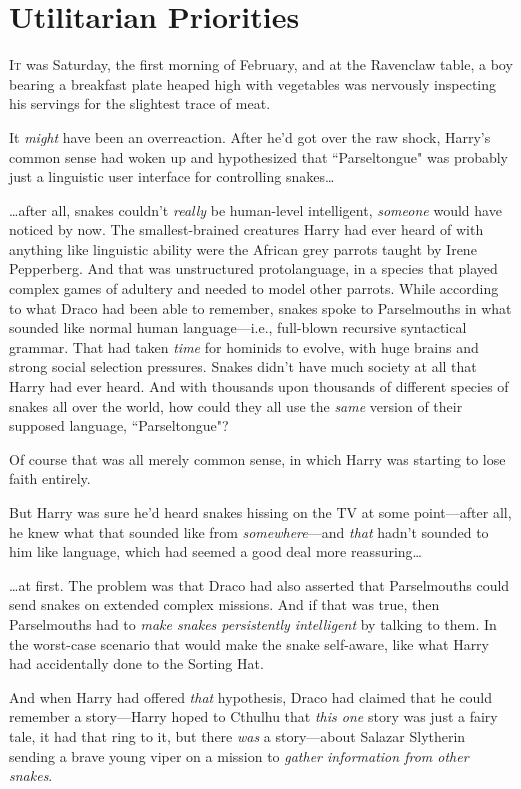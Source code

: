 \chapter{Utilitarian Priorities}

\lettrine{I}{t} was Saturday, the first morning of February, and at the Ravenclaw table, a boy bearing a breakfast plate heaped high with vegetables was nervously inspecting his servings for the slightest trace of meat.

It \emph{might} have been an overreaction. After he'd got over the raw shock, Harry's common sense had woken up and hypothesized that ``Parseltongue" was probably just a linguistic user interface for controlling snakes{\ldots}

{\ldots}after all, snakes couldn't \emph{really} be human-level intelligent, \emph{someone} would have noticed by now. The smallest-brained creatures Harry had ever heard of with anything like linguistic ability were the African grey parrots taught by Irene Pepperberg. And that was unstructured protolanguage, in a species that played complex games of adultery and needed to model other parrots. While according to what Draco had been able to remember, snakes spoke to Parselmouths in what sounded like normal human language—i.e., full-blown recursive syntactical grammar. That had taken \emph{time} for hominids to evolve, with huge brains and strong social selection pressures. Snakes didn't have much society at all that Harry had ever heard. And with thousands upon thousands of different species of snakes all over the world, how could they all use the \emph{same} version of their supposed language, ``Parseltongue"?

Of course that was all merely common sense, in which Harry was starting to lose faith entirely.

But Harry was sure he'd heard snakes hissing on the TV at some point—after all, he knew what that sounded like from \emph{somewhere}—and \emph{that} hadn't sounded to him like language, which had seemed a good deal more reassuring{\ldots}

{\ldots}at first. The problem was that Draco had also asserted that Parselmouths could send snakes on extended complex missions. And if that was true, then Parselmouths had to \emph{make snakes persistently intelligent} by talking to them. In the worst-case scenario that would make the snake self-aware, like what Harry had accidentally done to the Sorting Hat.

And when Harry had offered \emph{that} hypothesis, Draco had claimed that he could remember a story—Harry hoped to Cthulhu that \emph{this one} story was just a fairy tale, it had that ring to it, but there \emph{was} a story—about Salazar Slytherin sending a brave young viper on a mission to \emph{gather information from other snakes}.

